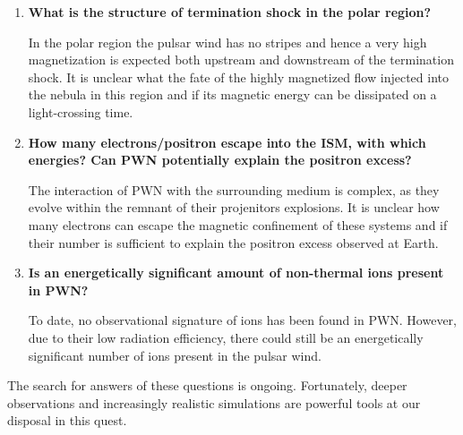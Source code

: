 \begin{enumerate}
\item \textbf{What is the structure of termination shock in the polar region? }

In the polar region the pulsar wind has no stripes and hence a very high magnetization is expected both upstream and downstream of the termination shock. It is unclear what the fate of the highly magnetized flow injected into the nebula in this region and if its magnetic energy can be dissipated on a light-crossing time.

\item \textbf{How many electrons/positron escape into the ISM, with which energies? Can PWN potentially explain the positron excess?}

The interaction of PWN with the surrounding medium is complex, as they evolve within the remnant of their projenitors explosions. It is unclear how many electrons can escape the magnetic confinement of these systems and if their number is sufficient to explain the positron excess observed at Earth.

\item \textbf{Is an energetically significant amount of non-thermal  ions present in PWN?}

To date, no observational signature of ions has been found in PWN. However, due to their low radiation efficiency, there could still be an energetically significant number of ions present in the pulsar wind.

\end{enumerate}

The search for answers of these questions is ongoing. Fortunately, deeper observations and increasingly realistic simulations are powerful tools at our disposal in this quest.
